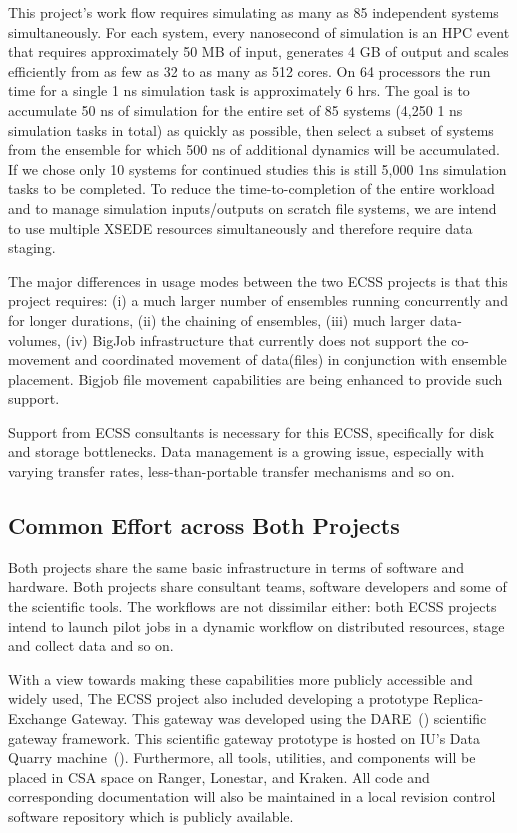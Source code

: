 \documentclass{sig-alternate}
\begin{document}
This project's work flow requires simulating as many as 85 independent systems
simultaneously. For each system, every nanosecond of simulation is an HPC event
that requires approximately 50 MB of input, generates 4 GB of output and scales
efficiently from as few as 32 to as many as 512 cores. On 64 processors the run
time for a single 1 ns simulation task is approximately 6 hrs. The goal is to
accumulate 50 ns of simulation for the entire set of 85 systems (4,250 1 ns
simulation tasks in total) as quickly as possible, then select a subset of
systems from the ensemble for which 500 ns of additional dynamics will be
accumulated. If we chose only 10 systems for continued studies this is still
5,000 1ns simulation tasks to be completed. To reduce the time-to-completion of
the entire workload and to manage simulation inputs/outputs on scratch file
systems, we are intend to use multiple XSEDE resources simultaneously and
therefore require data staging.

The major differences in usage modes between the two ECSS projects is that this
project requires: (i) a much larger number of ensembles running concurrently and
for longer durations, (ii) the chaining of ensembles, (iii) much larger
data-volumes, (iv)  BigJob infrastructure that currently does not support the
co-movement and coordinated movement of data(files) in conjunction with ensemble
placement. Bigjob file movement capabilities are being enhanced to provide
such support.

Support from ECSS consultants is necessary for this ECSS, specifically for disk
and storage bottlenecks. Data management is a growing issue, especially with
varying transfer rates, less-than-portable transfer mechanisms and so on.

\subsection{Common Effort across Both Projects}

Both projects share the same basic infrastructure in terms of software and
hardware. Both projects share consultant teams, software developers and some of
the scientific tools. The workflows are not dissimilar either: both ECSS
projects intend to launch pilot jobs in a dynamic workflow on distributed
resources, stage and collect data and so on.

With a view towards making these capabilities more publicly accessible and
widely used, The ECSS project also included developing a prototype
Replica-Exchange Gateway. This gateway was developed using the
DARE~(\cite{DARE})
scientific gateway framework. This scientific gateway prototype is hosted
on IU's Data Quarry machine~(\cite{DataQuarry}). Furthermore, all tools,
utilities, and components will be placed in CSA space on Ranger,
Lonestar, and Kraken. All code and corresponding documentation will also be
maintained in a local revision control software repository which is publicly
available.
\end{document}
